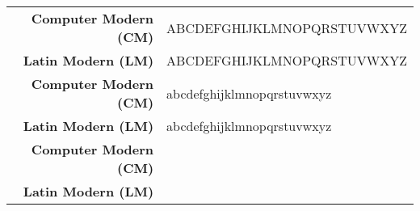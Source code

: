 \documentclass{standalone}
\newcommand{\cmfont}{\fontfamily{cmr}\selectfont}
\newcommand{\lmfont}{\fontfamily{ugq}\selectfont}
\newcommand{\UpperAlphabet}{ABCDEFGHIJKLMNOPQRSTUVWXYZ}
\newcommand{\LowerAlphabet}{abcdefghijklmnopqrstuvwxyz}
\newcommand{\Digits}{0123456789}
\begin{document}
\begin{tabular}{rl}
\toprule
	\textbf{Computer Modern (CM)} & {\cmfont \UpperAlphabet}
\\	\textbf{Latin Modern (LM)} & {\lmfont \UpperAlphabet}
\\	\textbf{Computer Modern (CM)} & {\cmfont \LowerAlphabet}
\\	\textbf{Latin Modern (LM)} & {\lmfont \LowerAlphabet}
\\	\textbf{Computer Modern (CM)} & {\cmfont \Digits}
\\	\textbf{Latin Modern (LM)} & {\lmfont \Digits}
\\ \bottomrule
\end{tabular}
\end{document}
